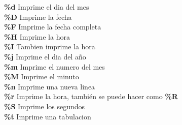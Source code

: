 \documentclass[11pt]{article}
\begin{document}
\hspace{2cm} \textbf{\%d} \hspace{2cm} Imprime el dia del mes\\

\hspace{2cm} \textbf{\%D} \hspace{2cm} Imprime la fecha\\

\hspace{2cm} \textbf{\%F}\hspace{2cm} Imprime la fecha completa \\

\hspace{2cm} \textbf{\%H}\hspace{2cm} Imprime la hora\\

\hspace{2cm} \textbf{\%I} \hspace{2cm} Tambien imprime la hora\\

\hspace{2cm} \textbf{\%j}\hspace{2cm} Imprime el dia del a\~no\\


\hspace{2cm} \textbf{\%m}\hspace{2cm} Imprime el numero del mes\\

\hspace{2cm} \textbf{\%M} \hspace{2cm} Imprime el minuto\\

\hspace{2cm} \textbf{\%n}
\hspace{2cm} Imprime una nueva linea\\

\hspace{2cm} \textbf{\%r} \hspace{2cm} Imprime la hora, también se puede hacer como \hspace{0.5cm}  \textbf{\%R}\\

\hspace{2cm} \textbf{\%S} \hspace{2cm} Imprime los segundos\\

\hspace{2cm} \textbf{\%t}\hspace{2cm} Imprime una tabulacion\\
\end{document}
